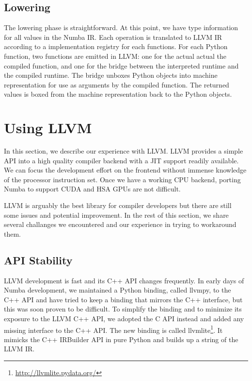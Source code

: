 \documentclass{acm_proc_article-sp}
\begin{document}
\subsection{Lowering}

The lowering phase is straightforward.  At this point, we have type information
for all values in the Numba IR. Each operation is translated to LLVM IR
according to a implementation registry for each functions.  For each Python
function, two functions are emitted in LLVM: one for the actual
actual the compiled function, and one for the bridge between the interpreted
runtime and the compiled runtime. The bridge unboxes Python objects into
machine representation for use as arguments by the compiled function.  The
returned values is boxed from the machine representation back to the Python
objects.


\section{Using LLVM}

In this section, we describe our experience with LLVM.
LLVM provides a simple API into a high quality compiler backend with
a JIT support readily available. We can focus the development effort
on the frontend without immense knowledge of the processor instruction set.
Once we have a working CPU backend, porting Numba to support CUDA and HSA GPUs
are not difficult.

LLVM is arguably the best library for compiler developers but there are still
some issues and potential improvement. In the rest of
this section, we share several challanges we encountered and our experience
in trying to workaround them.

\subsection{API Stability}

LLVM development is fast and its C++ API changes frequently.
In early days of Numba development, we maintained a Python binding,
called llvmpy, to the C++ API and have tried to keep a binding that
mirrors the C++ interface, but this was soon proven to be difficult.
To simplify the binding and to minimize its exposure to the LLVM C++ API,
we adopted the C API instead and added any missing interface to the C++ API.
The new binding is called llvmlite\footnote{\url{http://llvmlite.pydata.org/}}.
It mimicks the C++ IRBuilder API in pure Python and builds up a string of the LLVM IR.
\end{document}
